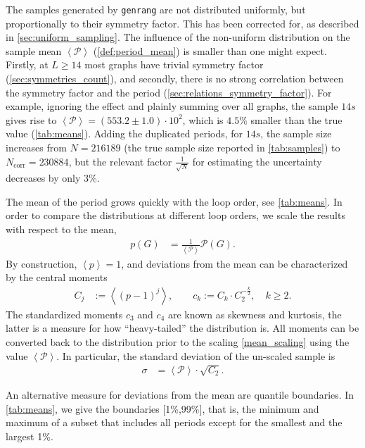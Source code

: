 \documentclass[12pt,a4paper]{article}
\newcommand{\period}{\mathcal P}
\renewcommand{\|}{\rule[-0.4ex]{0.2ex}{1.2em}}
\begin{document}
The samples generated by \texttt{genrang} are not distributed uniformly, but proportionally to their symmetry factor. This has been corrected for, as described in  \cref{sec:uniform_sampling}.
The influence of the non-uniform distribution on the sample mean $\left \langle \period \right \rangle $ (\cref{def:period_mean}) is smaller than  one might expect. Firstly,  at $L \geq 14$  most graphs have trivial symmetry factor (\cref{sec:symmetries_count}), and secondly, there is no strong correlation between the symmetry factor and the period (\cref{sec:relations_symmetry_factor}). For example, ignoring the effect and plainly summing over all graphs, the sample $14s$ gives rise to $\left \langle \period \right \rangle = (553.2 \pm 1.0) \cdot 10^2$, which is $4.5\%$ smaller than the true value (\cref{tab:means}).  Adding the duplicated periods, for $14s$, the sample size increases from $N=216189$ (the true sample size reported in \cref{tab:samples}) to $N_\text{corr}=230884$, but the relevant factor $\frac{1}{\sqrt{N}}$ for estimating the uncertainty decreases  by only 3\%. 





The mean of the period grows quickly with the loop order, see \cref{tab:means}. In order to compare the distributions at different loop orders, we scale the results with respect to the mean,
\begin{align}\label{mean_scaling}
p(G)   &= \frac{1}{\left \langle \period\right \rangle }\period(G).
\end{align}
By construction, $\left \langle p \right \rangle =1$, and deviations from the mean can be characterized by the central moments
\begin{align}\label{def:central_moments}
	C_j  &:= \left \langle (p-1)^j \right \rangle , \qquad c_k :=  C_k\cdot C_2^{-\frac k 2}, \quad k\geq 2.
\end{align}
The standardized moments $c_3$ and $c_4$ are known as skewness and kurtosis, the latter is a measure for how \enquote{heavy-tailed} the distribution is. All moments can be converted back to the distribution prior to the scaling \cref{mean_scaling} using the value $\left \langle \period \right \rangle $. In particular, the  standard deviation of the un-scaled sample is  
\begin{align}\label{C2_std}
	\sigma &= \left \langle   \period  \right \rangle   \cdot\sqrt{ C_2}.
\end{align}


An alternative measure for deviations from the mean are quantile boundaries. In \cref{tab:means}, we give the boundaries [1\%,99\%], that is, the minimum and maximum of a subset that includes all periods except for the smallest and the largest 1\%. 
\end{document}
